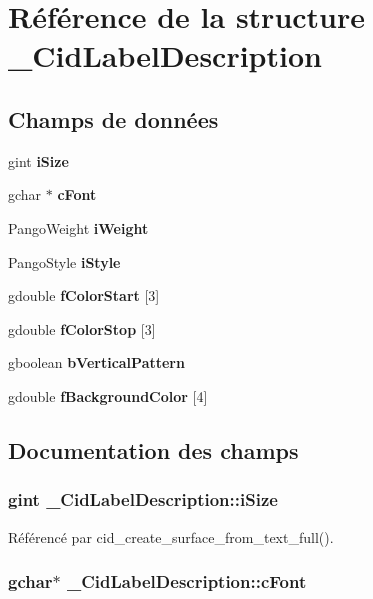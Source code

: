 \section{Référence de la structure \_\-CidLabelDescription}
\label{struct__CidLabelDescription}
\subsection*{Champs de données}
\begin{CompactItemize}
\item 
gint {\bf iSize}
\item 
gchar $\ast$ {\bf cFont}
\item 
PangoWeight {\bf iWeight}
\item 
PangoStyle {\bf iStyle}
\item 
gdouble {\bf fColorStart} [3]
\item 
gdouble {\bf fColorStop} [3]
\item 
gboolean {\bf bVerticalPattern}
\item 
gdouble {\bf fBackgroundColor} [4]
\end{CompactItemize}


\subsection{Documentation des champs}
\subsubsection{\setlength{\rightskip}{0pt plus 5cm}gint {\bf \_\-CidLabelDescription::iSize}}\label{struct__CidLabelDescription_21d11c44f0f35f1012bc32ea19e120c2}




Référencé par cid\_\-create\_\-surface\_\-from\_\-text\_\-full().
\subsubsection{\setlength{\rightskip}{0pt plus 5cm}gchar$\ast$ {\bf \_\-CidLabelDescription::cFont}}\label{struct__CidLabelDescription_294c624e7901723afdb119b4ce25204c}




